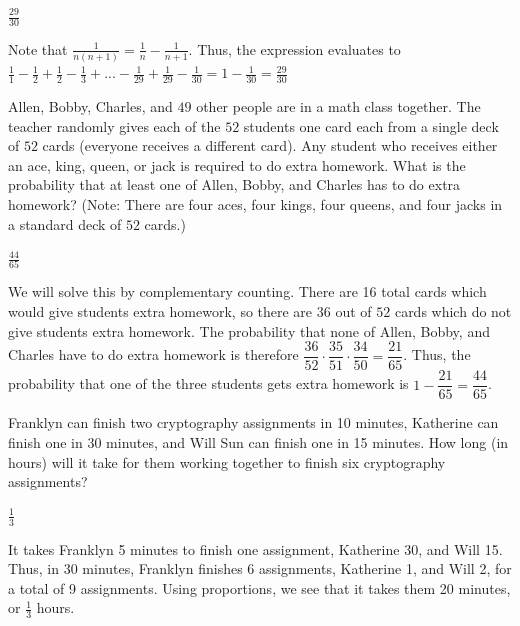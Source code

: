 \documentclass[11pt]{article}
\begin{document}
\begin{answer}
$\frac{29}{30}$
\end{answer}

\begin{solution}
Note that $\frac{1}{n(n+1)} = \frac{1}{n} - \frac{1}{n+1}$. Thus, the expression evaluates to $\frac{1}{1} - \frac{1}{2} + \frac{1}{2} - \frac{1}{3} + ... - \frac{1}{29} + \frac{1}{29} - \frac{1}{30} = 1-\frac{1}{30} = \boxed{\frac{29}{30}}$
\end{solution}


\begin{problem}
Allen, Bobby, Charles, and $49$ other people are in a math class together. The teacher randomly gives each of the $52$ students one card each from a single deck of $52$ cards (everyone receives a different card). Any student who receives either an ace, king, queen, or jack is required to do extra homework. What is the probability that at least one of Allen, Bobby, and Charles has to do extra homework? (Note: There are four aces, four kings, four queens, and four jacks in a standard deck of $52$ cards.) 
\end{problem}

\begin{answer}
$\frac{44}{65}$
\end{answer}

\begin{solution}
We will solve this by complementary counting. There are 16 total cards which would give students extra homework, so there are $36$ out of $52$ cards which do not give students extra homework. The probability that none of Allen, Bobby, and Charles have to do extra homework is therefore $\dfrac{36}{52}\cdot \dfrac{35}{51} \cdot \dfrac{34}{50} = \dfrac{21}{65}$. Thus, the probability that one of the three students gets extra homework is $1-\dfrac{21}{65} = \boxed{\dfrac{44}{65}}$.
\end{solution}


\begin{problem}
Franklyn can finish two cryptography assignments in 10 minutes, Katherine can finish one in 30 minutes, and Will Sun can finish one in 15 minutes. How long (in hours) will it take for them working together to finish six cryptography assignments?
\end{problem}

\begin{answer}
$\frac{1}{3}$
\end{answer}

\begin{solution}
It takes Franklyn 5 minutes to finish one assignment, Katherine 30, and Will 15. Thus, in 30 minutes, Franklyn finishes 6 assignments, Katherine 1, and Will 2, for a total of 9 assignments. Using proportions, we see that it takes them 20 minutes, or $\boxed{\frac{1}{3}}$ hours.
\end{solution}
\end{document}
